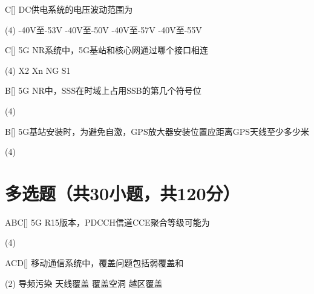 \begin{choice}{C}[]
    DC供电系统的电压波动范围为
    \begin{tasks}(4)
        \task -40V至-53V
        \task -40V至-50V
        \task -40V至-57V
        \task -40V至-55V
    \end{tasks}
\end{choice}


\begin{choice}{C}[]
    5G NR系统中，5G基站和核心网通过哪个接口相连
    \begin{tasks}(4)
        \task X2
        \task Xn
        \task NG
        \task S1
    \end{tasks}
\end{choice}


\begin{choice}{B}[]
    5G NR中，SSS在时域上占用SSB的第几个符号位
    \begin{tasks}(4)
    \end{tasks}
\end{choice}


\begin{choice}{B}[]
    5G基站安装时，为避免自激，GPS放大器安装位置应距离GPS天线至少多少米
    \begin{tasks}(4)
    \end{tasks}
\end{choice}



\section{多选题（共30小题，共120分）}

\begin{choice}{\;ABC\;}[]
    5G R15版本，PDCCH信道CCE聚合等级可能为
    \begin{tasks}(4)
    \end{tasks}
\end{choice}

\begin{choice}{\;ACD\;}[]
    移动通信系统中，覆盖问题包括弱覆盖和
    \begin{tasks}(2)
        \task 导频污染
        \task 天线覆盖
        \task 覆盖空洞
        \task 越区覆盖
    \end{tasks}
\end{choice}

